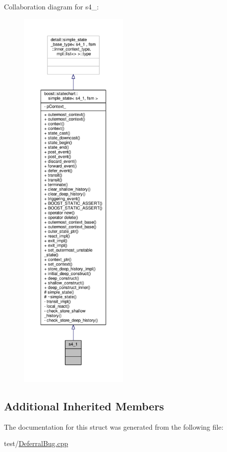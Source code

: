 Collaboration diagram for s4\+\_\+:
\nopagebreak
\begin{figure}[H]
\begin{center}
\leavevmode
\includegraphics[height=550pt]{structs4__1__coll__graph}
\end{center}
\end{figure}
\subsection*{Additional Inherited Members}


The documentation for this struct was generated from the following file\+:\begin{DoxyCompactItemize}
\item 
test/\mbox{\hyperlink{_deferral_bug_8cpp}{Deferral\+Bug.\+cpp}}\end{DoxyCompactItemize}
